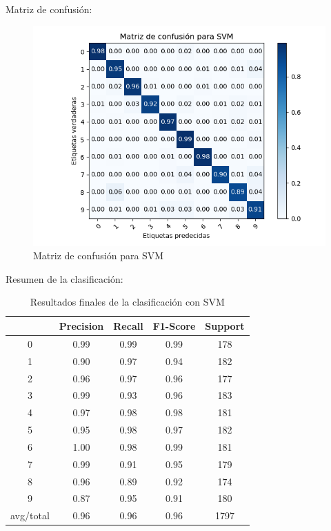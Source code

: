 Matriz de confusión:

\begin{figure}[H] %
	\centering
	\includegraphics[scale=0.8]{conf-m-svm.png}  %
	\caption{Matriz de confusión para SVM} 
	\label{fig:conf-m-svm}
\end{figure}

\newpage
Resumen de la clasificación:


\begin{table}[H]
	\centering
	\begin{tabular}{|c|c|c|c|c|}
		\hline
		& Precision & Recall & F1-Score & Support \\ \hline
		0         & 0.99      & 0.99   & 0.99     & 178     \\ \hline
		1         & 0.90      & 0.97   & 0.94     & 182     \\ \hline
		2         & 0.96      & 0.97   & 0.96     & 177     \\ \hline
		3         & 0.99      & 0.93   & 0.96     & 183     \\ \hline
		4         & 0.97      & 0.98   & 0.98     & 181     \\ \hline
		5         & 0.95      & 0.98   & 0.97     & 182     \\ \hline
		6         & 1.00      & 0.98   & 0.99     & 181     \\ \hline
		7         & 0.99      & 0.91   & 0.95     & 179     \\ \hline
		8         & 0.96      & 0.89   & 0.92     & 174     \\ \hline
		9         & 0.87      & 0.95   & 0.91     & 180     \\ \hline
		avg/total & 0.96      & 0.96   & 0.96     & 1797    \\ \hline
	\end{tabular}
	\caption{Resultados finales de la clasificación con SVM}
\end{table}

